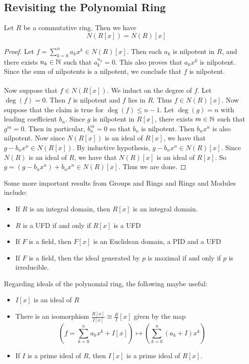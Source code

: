 \documentclass[a4paper]{article}
\begin{document}
\subsection{Revisiting the Polynomial Ring}
\begin{prp}{}{} Let $R$ be a commutative ring. Then we have $$N(R[x])=N(R)[x]$$ \tcbline
\begin{proof}
Let $f=\sum_{k=0}^na_kx^k\in N(R)[x]$. Then each $a_k$ is nilpotent in $R$, and there exists $n_k\in\mathbb{N}$ such that $a_k^{n_k}=0$. This also proves that $a_kx^k$ is nilpotent. Since the sum of nilpotents is a nilpotent, we conclude that $f$ is nilpotent. \\~\\

Now suppose that $f\in N(R[x])$. We induct on the degree of $f$. Let $\deg(f)=0$. Then $f$ is nilpotent and $f$ lies in $R$. Thus $f\in N(R)[x]$. Now suppose that the claim is true for $\deg(f)\leq n-1$. Let $\deg(g)=n$ with leading coefficient $b_n$. Since $g$ is nilpotent in $R[x]$, there exists $m\in\mathbb{N}$ such that $g^m=0$. Then in particular, $b_n^m=0$ so that $b_n$ is nilpotent. Then $b_nx^n$ is also nilpotent. Now since $N(R[x])$ is an ideal of $R[x]$, we have that $g-b_nx^n\in N(R[x])$. By inductive hypothesis, $g-b_nx^n\in N(R)[x]$. Since $N(R)$ is an ideal of $R$, we have that $N(R)[x]$ is an ideal of $R[x]$. So $g=(g-b_nx^n)+b_nx^n\in N(R)[x]$. Thus we are done. 
\end{proof}
\end{prp}

Some more important results from Groups and Rings and Rings and Modules include: 
\begin{itemize}
\item If $R$ is an integral domain, then $R[x]$ is an integral domain. 
\item $R$ is a UFD if and only if $R[x]$ is a UFD
\item If $F$ is a field, then $F[x]$ is an Euclidean domain, a PID and a UFD
\item If $F$ is a field, then the ideal generated by $p$ is maximal if and only if $p$ is irreducible. 
\end{itemize}

Regarding ideals of the polynomial ring, the following maybe useful: 
\begin{itemize}
\item $I[x]$ is an ideal of $R$
\item There is an isomorphism $\frac{R[x]}{I[x]}\cong\frac{R}{I}[x]$ given by the map $$\left(f=\sum_{k=0}^na_kx^k+I[x]\right)\mapsto\left(\sum_{k=0}^n(a_k+I)x^k\right)$$
\item If $I$ is a prime ideal of $R$, then $I[x]$ is a prime ideal of $R[x]$. 
\end{itemize}
\end{document}
